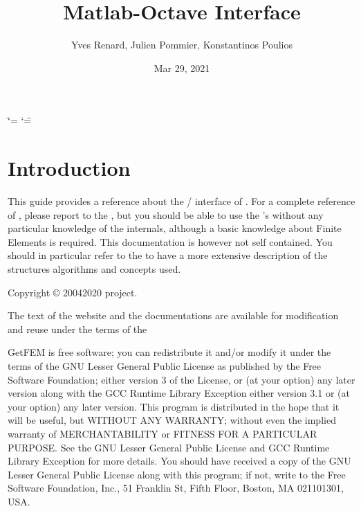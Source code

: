\documentclass[a4paper,11pt,english]{sphinxmanual}
\title{Matlab-Octave Interface}
\date{Mar 29, 2021}
\author{Yves Renard, Julien Pommier, Konstantinos Poulios}
\begin{document}
\ifdefined\shorthandoff
  \ifnum\catcode`\=\string=\active\shorthandoff{=}\fi
  \ifnum\catcode`\"=\active{}\fi
\fi

\pagestyle{empty}
\sphinxmaketitle
\pagestyle{plain}
\sphinxtableofcontents
\pagestyle{normal}
\label{\detokenize{matlab_octave/index::doc}}



\chapter{Introduction}
\label{\detokenize{matlab_octave/intro:introduction}}\label{\detokenize{matlab_octave/intro:mlab-intro}}\label{\detokenize{matlab_octave/intro::doc}}
\sphinxAtStartPar
This guide provides a reference about the / interface of .
For a complete  reference of , please report to the ,
but you should be able to use the ’s without any particular knowledge
of the  internals, although a basic knowledge about Finite Elements
is required. This documentation is however not self contained. You should in
particular refer to the  to have a more extensive
description of the structures algorithms and concepts used.

\sphinxAtStartPar
Copyright © 2004\sphinxhyphen{}2020  project.

\sphinxAtStartPar
The text of the  website and the documentations are available for modification and reuse under the terms of the 

\sphinxAtStartPar
GetFEM  is  free software;  you  can  redistribute  it  and/or modify it
under  the  terms  of the  GNU  Lesser General Public License as published
by  the  Free Software Foundation;  either version 3 of the License,  or
(at your option) any later version along with the GCC Runtime Library
Exception either version 3.1 or (at your option) any later version.
This program  is  distributed  in  the  hope  that it will be useful,  but
WITHOUT ANY WARRANTY; without even the implied warranty of MERCHANTABILITY
or  FITNESS  FOR  A PARTICULAR PURPOSE.  See the GNU Lesser General Public
License and GCC Runtime Library Exception for more details.
You  should  have received a copy of the GNU Lesser General Public License
along  with  this program;  if not, write to the Free Software Foundation,
Inc., 51 Franklin St, Fifth Floor, Boston, MA  02110\sphinxhyphen{}1301, USA.
\end{document}

